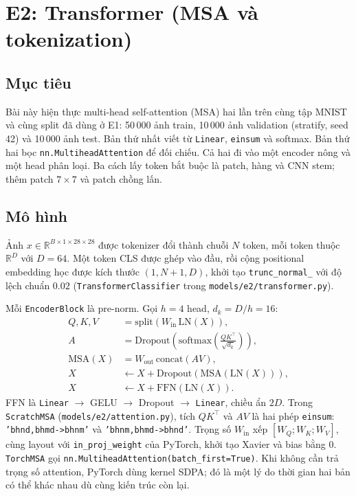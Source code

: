 
\section{E2: Transformer (MSA và tokenization)}

\subsection{Mục tiêu}
Bài này hiện thực multi-head self-attention (MSA) hai lần trên cùng tập MNIST và cùng split đã dùng ở E1: 50\,000 ảnh train, 10\,000 ảnh validation (stratify, seed 42) và 10\,000 ảnh test. Bản thứ nhất viết từ \texttt{Linear}, \texttt{einsum} và softmax. Bản thứ hai bọc \texttt{nn.MultiheadAttention} để đối chiếu. Cả hai đi vào một encoder nông và một head phân loại. Ba cách lấy token bắt buộc là patch, hàng và CNN stem; thêm patch \(7\times7\) và patch chồng lấn.

\subsection{Mô hình}
Ảnh \(x\in\mathbb{R}^{B\times 1\times 28\times 28}\) được tokenizer đổi thành chuỗi \(N\) token, mỗi token thuộc \(\mathbb{R}^{D}\) với \(D=64\). Một token CLS được ghép vào đầu, rồi cộng positional embedding học được kích thước \((1, N+1, D)\), khởi tạo \texttt{trunc\_normal\_} với độ lệch chuẩn \(0.02\) (\texttt{TransformerClassifier} trong \texttt{models/e2/transformer.py}).

Mỗi \texttt{EncoderBlock} là pre-norm. Gọi \(h=4\) head, \(d_k=D/h=16\):
\begin{equation}
\begin{aligned}
Q,K,V &= \mathrm{split}(W_{\mathrm{in}}\,\mathrm{LN}(X)), \\
A &= \mathrm{Dropout}\!\left(\mathrm{softmax}\!\left(\frac{QK^{\top}}{\sqrt{d_k}}\right)\right), \\
\mathrm{MSA}(X) &= W_{\mathrm{out}}\,\mathrm{concat}(AV), \\
X &\leftarrow X + \mathrm{Dropout}(\mathrm{MSA}(\mathrm{LN}(X))), \\
X &\leftarrow X + \mathrm{FFN}(\mathrm{LN}(X)).
\end{aligned}
\end{equation}
FFN là \texttt{Linear} \(\to\) GELU \(\to\) Dropout \(\to\) \texttt{Linear}, chiều ẩn \(2D\). Trong \texttt{ScratchMSA} (\texttt{models/e2/attention.py}), tích \(QK^{\top}\) và \(AV\) là hai phép \texttt{einsum}: \texttt{'bhnd,bhmd->bhnm'} và \texttt{'bhnm,bhmd->bhnd'}. Trọng số \(W_{\mathrm{in}}\) xếp \([W_Q; W_K; W_V]\), cùng layout với \texttt{in\_proj\_weight} của PyTorch, khởi tạo Xavier và bias bằng 0. \texttt{TorchMSA} gọi \texttt{nn.MultiheadAttention(batch\_first=True)}. Khi không cần trả trọng số attention, PyTorch dùng kernel SDPA; đó là một lý do thời gian hai bản có thể khác nhau dù cùng kiến trúc còn lại.

